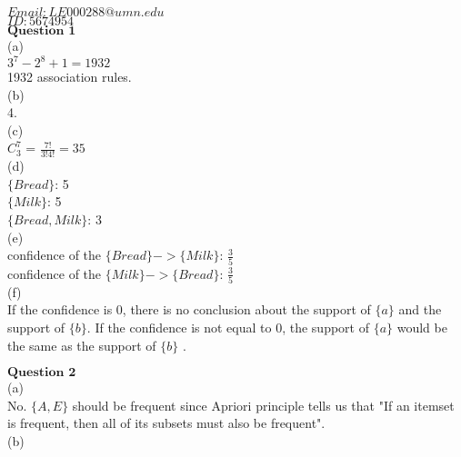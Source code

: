 \documentclass[12pt]{article}
\begin{document}
$Email: LE000288@umn.edu$\\

$ID:5674954$\\

$\textbf{Question 1}$\\

(a)\\

$3^7-2^8+1 = 1932$\\

1932 association rules.\\

(b)\\

4.\\

(c)\\

$C_3^7$ = $\frac{7!}{3!4!} = 35$\\

(d)\\

$\{Bread\}$: 5\\

$\{Milk\}$: 5\\

$\{Bread,Milk\}$: 3\\

(e)\\

confidence of the $\{Bread\} -> \{Milk\}$: $\frac{3}{5}$\\

confidence of the $\{Milk\} -> \{Bread\}$: $\frac{3}{5}$\\

(f)\\

If the confidence is 0, there is no conclusion about the support of $\{a\}$ and the support of $\{b\}$. If the confidence is not equal to 0, the support of $\{a\}$ would be the same as the support of $\{b\}$ .

\newpage

$\textbf{Question 2}$\\

(a)\\

No. $\{A,E\}$ should be frequent since Apriori principle tells us that "If an itemset is frequent, then all of its subsets must also be frequent".\\

(b)\\
\end{document}
